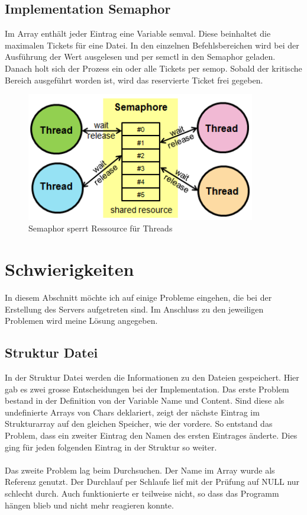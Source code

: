\documentclass[12pt,a4paper,ngerman]{report}
\begin{document}
\subsection{Implementation Semaphor}
Im Array enthält jeder Eintrag eine Variable semval. Diese beinhaltet die maximalen Tickets für eine Datei. In den einzelnen Befehlsbereichen wird bei der Ausführung der Wert ausgelesen und per semctl in den Semaphor geladen. Danach holt sich der Prozess ein oder alle Tickets per semop. Sobald der kritische Bereich ausgeführt worden ist, wird das reservierte Ticket frei gegeben.
\begin{figure}[h!]
\centering
\includegraphics[width=10cm]{img/semaphore.png}
\caption{Semaphor sperrt Ressource für Threads\protect\footnotemark}
\end{figure}
\section{Schwierigkeiten}
In diesem Abschnitt möchte ich auf einige Probleme eingehen, die bei der Erstellung des Servers aufgetreten sind. Im Anschluss zu den jeweiligen Problemen wird meine Lösung angegeben.
\subsection{Struktur Datei}
In der Struktur Datei werden die Informationen zu den Dateien gespeichert. Hier gab es zwei grosse Entscheidungen bei der Implementation. Das erste Problem bestand in der Definition von der Variable Name und Content. Sind diese als undefinierte Arrays von Chars deklariert, zeigt der nächste Eintrag im Strukturarray auf den gleichen Speicher, wie der vordere. So entstand das Problem, dass ein zweiter Eintrag den Namen des ersten Eintrages änderte. Dies ging für jeden folgenden Eintrag in der Struktur so weiter.\\
\\
Das zweite Problem lag beim Durchsuchen. Der Name im Array wurde als Referenz genutzt. Der Durchlauf per Schlaufe lief mit der Prüfung auf NULL nur schlecht durch. Auch funktionierte er teilweise nicht, so dass das Programm hängen blieb und nicht mehr reagieren konnte.
\end{document}

